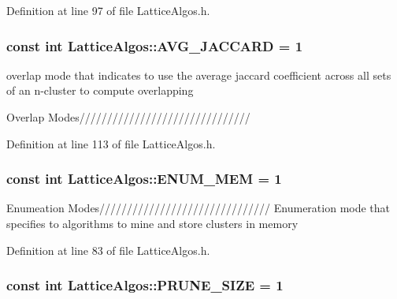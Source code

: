 Definition at line 97 of file LatticeAlgos.h.

\hypertarget{class_lattice_algos_a24156b300d4b23d0d618f548091d0aeb}{
\subsubsection[{AVG\_\-JACCARD}]{\setlength{\rightskip}{0pt plus 5cm}const int {\bf LatticeAlgos::AVG\_\-JACCARD} = 1}}
\label{class_lattice_algos_a24156b300d4b23d0d618f548091d0aeb}


overlap mode that indicates to use the average jaccard coefficient across all sets of an n-\/cluster to compute overlapping 

Overlap Modes/////////////////////////////// 

Definition at line 113 of file LatticeAlgos.h.

\hypertarget{class_lattice_algos_a80df6360d3246d74ae31e51e6c4bfa0e}{
\subsubsection[{ENUM\_\-MEM}]{\setlength{\rightskip}{0pt plus 5cm}const int {\bf LatticeAlgos::ENUM\_\-MEM} = 1}}
\label{class_lattice_algos_a80df6360d3246d74ae31e51e6c4bfa0e}
Enumeation Modes/////////////////////////////// Enumeration mode that specifies to algorithms to mine and store clusters in memory 

Definition at line 83 of file LatticeAlgos.h.

\hypertarget{class_lattice_algos_a9a1d69347724b131f372706322776bbb}{
\subsubsection[{PRUNE\_\-SIZE}]{\setlength{\rightskip}{0pt plus 5cm}const int {\bf LatticeAlgos::PRUNE\_\-SIZE} = 1}}
\label{class_lattice_algos_a9a1d69347724b131f372706322776bbb}


